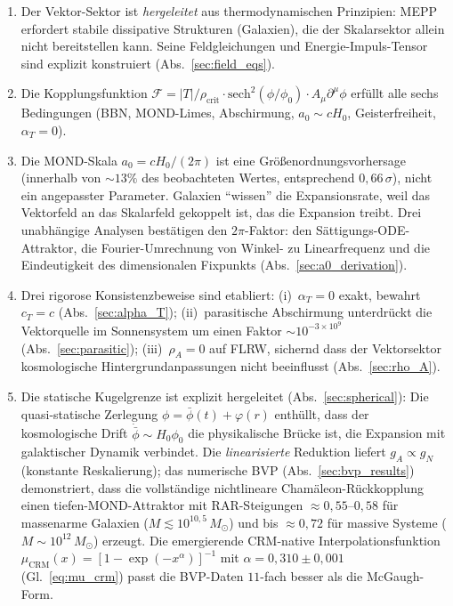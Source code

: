 \documentclass[aps,prd,twocolumn,superscriptaddress,nofootinbib]{revtex4-2}
\begin{document}
\begin{enumerate}
\item Der Vektor-Sektor ist \textit{hergeleitet} aus thermodynamischen Prinzipien: MEPP erfordert stabile dissipative Strukturen (Galaxien), die der Skalarsektor allein nicht bereitstellen kann. Seine Feldgleichungen und Energie-Impuls-Tensor sind explizit konstruiert (Abs.~\ref{sec:field_eqs}).

\item Die Kopplungsfunktion $\mathcal{F} = |T|/\rho_{\mathrm{crit}} \cdot \mathrm{sech}^2(\phi/\phi_0) \cdot A_\mu\partial^\mu\phi$ erf\"ullt alle sechs Bedingungen (BBN, MOND-Limes, Abschirmung, $a_0 \sim cH_0$, Geisterfreiheit, $\alpha_T = 0$).

\item Die MOND-Skala $a_0 = cH_0/(2\pi)$ ist eine Gr\"o\ss{}enordnungsvorhersage (innerhalb von $\sim 13\%$ des beobachteten Wertes, entsprechend $0{,}66\,\sigma$), nicht ein angepasster Parameter. Galaxien ``wissen'' die Expansionsrate, weil das Vektorfeld an das Skalarfeld gekoppelt ist, das die Expansion treibt. Drei unabh\"angige Analysen best\"atigen den $2\pi$-Faktor: den S\"attigungs-ODE-Attraktor, die Fourier-Umrechnung von Winkel- zu Linearfrequenz und die Eindeutigkeit des dimensionalen Fixpunkts (Abs.~\ref{sec:a0_derivation}).

\item Drei rigorose Konsistenzbeweise sind etabliert: (i)~$\alpha_T = 0$ exakt, bewahrt $c_T = c$ (Abs.~\ref{sec:alpha_T}); (ii)~parasitische Abschirmung unterdr\"uckt die Vektorquelle im Sonnensystem um einen Faktor $\sim 10^{-3 \times 10^9}$ (Abs.~\ref{sec:parasitic}); (iii)~$\rho_A = 0$ auf FLRW, sichernd dass der Vektorsektor kosmologische Hintergrundanpassungen nicht beeinflusst (Abs.~\ref{sec:rho_A}).

\item Die statische Kugelgrenze ist explizit hergeleitet (Abs.~\ref{sec:spherical}): Die quasi-statische Zerlegung $\phi = \bar{\phi}(t) + \varphi(r)$ enth\"ullt, dass der kosmologische Drift $\dot{\bar{\phi}} \sim H_0\phi_0$ die physikalische Br\"ucke ist, die Expansion mit galaktischer Dynamik verbindet. Die \textit{linearisierte} Reduktion liefert $g_A \propto g_N$ (konstante Reskalierung); das numerische BVP (Abs.~\ref{sec:bvp_results}) demonstriert, dass die vollst\"andige nichtlineare Cham\"aleon-R\"uckkopplung einen tiefen-MOND-Attraktor mit RAR-Steigungen $\approx 0{,}55$--$0{,}58$ f\"ur massenarme Galaxien ($M \lesssim 10^{10{,}5}\,M_\odot$) und bis $\approx 0{,}72$ f\"ur massive Systeme ($M \sim 10^{12}\,M_\odot$) erzeugt. Die emergierende CRM-native Interpolationsfunktion $\mu_{\mathrm{CRM}}(x) = [1 - \exp(-x^\alpha)]^{-1}$ mit $\alpha = 0{,}310 \pm 0{,}001$ (Gl.~\ref{eq:mu_crm}) passt die BVP-Daten $11$-fach besser als die McGaugh-Form.


\end{enumerate}
\end{document}
